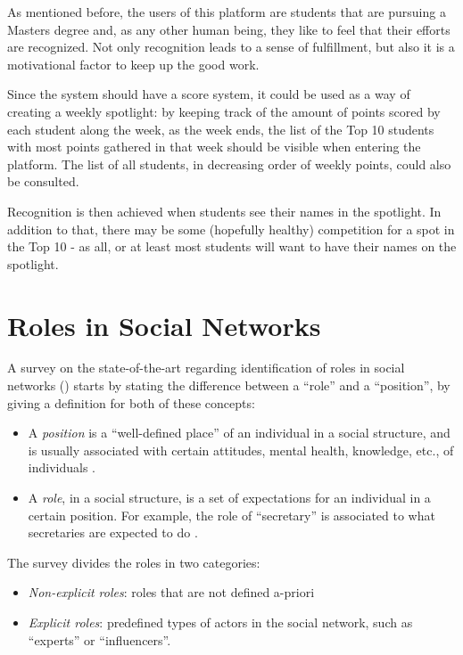 As mentioned before, the users of this platform are students that are pursuing a Masters degree and, as any other human being, they like to feel that their efforts are recognized. Not only recognition leads to a sense of fulfillment, but also it is a motivational factor to keep up the good work. 

Since the system should have a score system, it could be used as a way of creating a weekly spotlight: by keeping track of the amount of points scored by each student along the week, as the week ends, the list of the Top 10 students with most points gathered in that week should be visible when entering the platform. The list of all students, in decreasing order of weekly points, could also be consulted.

Recognition is then achieved when students see their names in the spotlight. In addition to that, there may be some (hopefully healthy) competition for a spot in the Top 10 - as all, or at least most students will want to have their names on the spotlight.

\section{Roles in Social Networks}
\label{section:relatedWorkRoles}
A survey on the state-of-the-art regarding identification of roles in social networks (\cite{forestier2012roles}) starts by stating the difference between a ``role'' and a ``position'', by giving a definition for both of these concepts:
\begin{itemize}
\item A \textit{position} is a ``well-defined place'' of an individual in a social structure, and is usually associated with certain attitudes, mental health, knowledge, etc., of individuals \cite{forestier2012roles,borgatti1992notions}.
\item A \textit{role}, in a social structure, is a set of expectations for an individual in a certain position. For example, the role of ``secretary'' is associated to what secretaries are expected to do \cite{forestier2012roles,nadel1957theory}.
\end{itemize}
The survey divides the roles in two categories:
\begin{itemize}
\item \textit{Non-explicit roles}: roles that are not defined a-priori
\item \textit{Explicit roles}: predefined types of actors in the social network, such as ``experts'' or ``influencers''.
\end{itemize}

